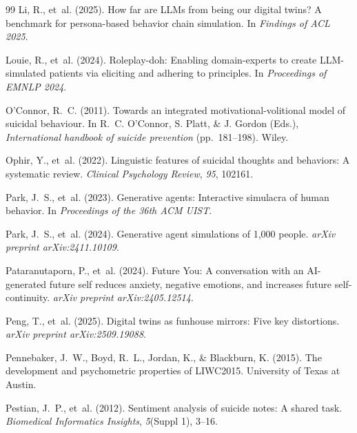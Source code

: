 \documentclass[review,12pt,authoryear]{elsarticle}
\begin{document}
\begin{thebibliography}{99}
Li, R., et~al. (2025).
\newblock How far are {LLMs} from being our digital twins? {A} benchmark for persona-based behavior chain simulation.
\newblock In \textit{Findings of ACL 2025}.

Louie, R., et~al. (2024).
\newblock Roleplay-doh: {E}nabling domain-experts to create {LLM}-simulated patients via eliciting and adhering to principles.
\newblock In \textit{Proceedings of EMNLP 2024}.

O'Connor, R.~C. (2011).
\newblock Towards an integrated motivational-volitional model of suicidal behaviour.
\newblock In R.~C. O'Connor, S. Platt, \& J. Gordon (Eds.), \textit{International handbook of suicide prevention} (pp.\ 181--198). Wiley.

Ophir, Y., et~al. (2022).
\newblock Linguistic features of suicidal thoughts and behaviors: {A} systematic review.
\newblock \textit{Clinical Psychology Review}, \textit{95}, 102161.

Park, J.~S., et~al. (2023).
\newblock Generative agents: {I}nteractive simulacra of human behavior.
\newblock In \textit{Proceedings of the 36th ACM UIST}.

Park, J.~S., et~al. (2024).
\newblock Generative agent simulations of 1,000 people.
\newblock \textit{arXiv preprint arXiv:2411.10109}.

Pataranutaporn, P., et~al. (2024).
\newblock Future {Y}ou: {A} conversation with an {AI}-generated future self reduces anxiety, negative emotions, and increases future self-continuity.
\newblock \textit{arXiv preprint arXiv:2405.12514}.

Peng, T., et~al. (2025).
\newblock Digital twins as funhouse mirrors: {F}ive key distortions.
\newblock \textit{arXiv preprint arXiv:2509.19088}.

Pennebaker, J.~W., Boyd, R.~L., Jordan, K., \& Blackburn, K. (2015).
\newblock The development and psychometric properties of {LIWC2015}.
\newblock University of Texas at Austin.

Pestian, J.~P., et~al. (2012).
\newblock Sentiment analysis of suicide notes: {A} shared task.
\newblock \textit{Biomedical Informatics Insights}, \textit{5}(Suppl 1), 3--16.


\end{thebibliography}
\end{document}
